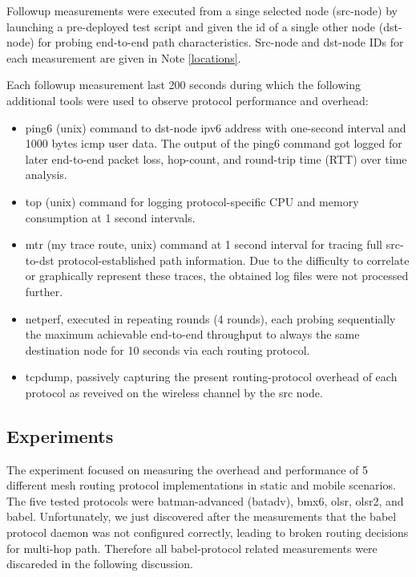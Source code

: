 \documentclass[a4paper,12pt,twoside]{article}
\begin{document}
Followup measurements were executed from a singe selected node
(src-node) by launching a pre-deployed test script \cite{wbm-test} and
given the id of a single other node (dst-node) for probing end-to-end
path characteristics. Src-node and dst-node IDs for each measurement
are given in Note \ref{locations}.

Each followup measurement last 200 seconds during which the following
additional tools were used to observe protocol performance and
overhead: 
\begin{itemize}
\item ping6 (unix) command to dst-node ipv6 address with one-second interval
  and 1000 bytes icmp user data. The output of the ping6 command got
  logged for later end-to-end packet loss, hop-count, and round-trip
  time (RTT) over time analysis.

\item top (unix) command for logging protocol-specific CPU and memory
  consumption at 1 second intervals.

\item mtr (my trace route, unix) command at 1 second interval for
  tracing full src-to-dst protocol-established path information. Due
  to the difficulty to correlate or graphically represent these traces,
  the obtained log files were not processed further.

\item netperf, executed in repeating rounds (4 rounds), each probing
  sequentially the maximum achievable end-to-end throughput to always
  the same destination node for 10 seconds via each routing protocol.
  
\item tcpdump, passively capturing the present routing-protocol
  overhead of each protocol as reveived on the wireless channel by the
  src node.

\end{itemize}

\subsection{Experiments}

The experiment focused on measuring the overhead and performance of 5
different mesh routing protocol implementations in static and mobile
scenarios. The five tested protocols were batman-advanced (batadv),
bmx6, olsr, olsr2, and babel. Unfortunately, we just discovered after
the measurements that the babel protocol daemon was not configured
correctly, leading to broken routing decisions for multi-hop
path. Therefore all babel-protocol related measurements were discareded
in the following discussion.
\end{document}
